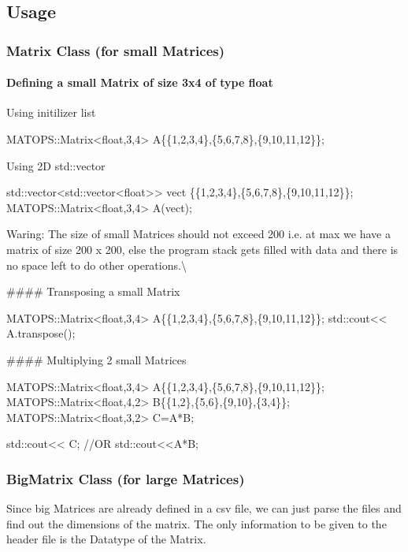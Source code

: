 \subsection*{Usage}

\subsubsection*{Matrix Class (for small Matrices)}

\paragraph*{Defining a small Matrix of size 3x4 of type float}

Using initilizer list 
\begin{DoxyCode}
MATOPS::Matrix<float,3,4> A\{\{1,2,3,4\},\{5,6,7,8\},\{9,10,11,12\}\};
\end{DoxyCode}


Using 2D std\+::vector 
\begin{DoxyCode}
std::vector<std::vector<float>> vect \{\{1,2,3,4\},\{5,6,7,8\},\{9,10,11,12\}\};
MATOPS::Matrix<float,3,4> A(vect);
\end{DoxyCode}
 Waring\+: The size of small Matrices should not exceed 200 i.\+e. at max we have a matrix of size 200 x 200, else the program stack gets filled with data and there is no space left to do other operations.\textbackslash{}

\#\#\#\# Transposing a small Matrix 
\begin{DoxyCode}
MATOPS::Matrix<float,3,4> A\{\{1,2,3,4\},\{5,6,7,8\},\{9,10,11,12\}\};
std::cout<< A.transpose();
\end{DoxyCode}


\#\#\#\# Multiplying 2 small Matrices 
\begin{DoxyCode}
MATOPS::Matrix<float,3,4> A\{\{1,2,3,4\},\{5,6,7,8\},\{9,10,11,12\}\};
MATOPS::Matrix<float,4,2> B\{\{1,2\},\{5,6\},\{9,10\},\{3,4\}\};
MATOPS::Matrix<float,3,2> C=A*B;

std::cout<< C;
//OR
std::cout<<A*B;
\end{DoxyCode}


\subsubsection*{Big\+Matrix Class (for large Matrices)}

Since big Matrices are already defined in a csv file, we can just parse the files and find out the dimensions of the matrix. The only information to be given to the header file is the Datatype of the Matrix.

